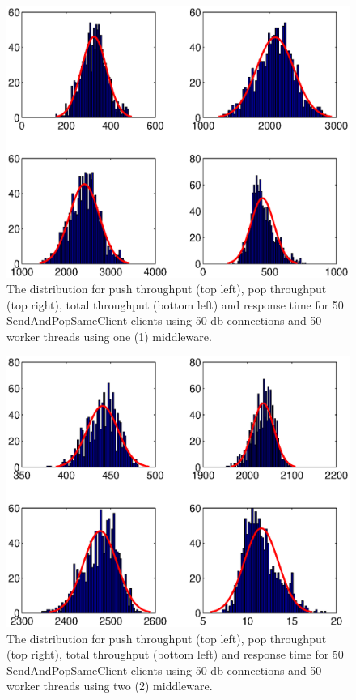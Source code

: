 \documentclass{article}
\begin{document}
\begin{table}
\begin{tabular}
        \begin{figure}[hbtp]
        \centering
        \includegraphics[scale=1]{img/histfit_1middleware_push_rop_total_resptime.eps}
        \caption{The distribution for push throughput (top left), pop throughput (top right), total throughput (bottom left) and response time for 50 SendAndPopSameClient clients using 50 db-connections and 50 worker threads using one (1) middleware.}
        \end{figure}
        
        \begin{figure}[hbtp]
        \centering
        \includegraphics[scale=1]{img/histfit_10middleware_push_rop_total_resptime.eps}
        \caption{The distribution for push throughput (top left), pop throughput (top right), total throughput (bottom left) and response time for 50 SendAndPopSameClient clients using 50 db-connections and 50 worker threads using two (2) middleware.}
        \end{figure}
        

\end{tabular}
\end{table}
\end{document}
